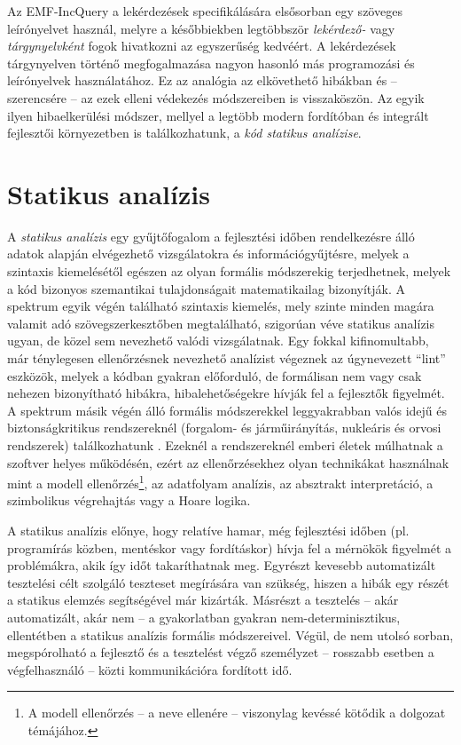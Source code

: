 Az EMF-IncQuery a lekérdezések specifikálására elsősorban egy szöveges leírónyelvet használ, melyre a későbbiekben legtöbbször \emph{lekérdező-} vagy \emph{tárgynyelvként} fogok hivatkozni az egyszerűség kedvéért.
A lekérdezések tárgynyelven történő megfogalmazása nagyon hasonló más programozási és leírónyelvek használatához.
Ez az analógia az elkövethető hibákban és -- szerencsére -- az ezek elleni védekezés módszereiben is visszaköszön.
Az egyik ilyen hibaelkerülési módszer, mellyel a legtöbb modern fordítóban és integrált fejlesztői környezetben is találkozhatunk, a \emph{kód statikus analízise}.

\section{Statikus analízis}

A \emph{statikus analízis} egy gyűjtőfogalom a fejlesztési időben rendelkezésre álló adatok alapján elvégezhető vizsgálatokra és információgyűjtésre, melyek a szintaxis kiemelésétől egészen az olyan formális módszerekig terjedhetnek, melyek a kód bizonyos szemantikai tulajdonságait matematikailag bizonyítják.
A spektrum egyik végén található szintaxis kiemelés, mely szinte minden magára valamit adó szövegszerkesztőben megtalálható, szigorúan véve statikus analízis ugyan, de közel sem nevezhető valódi vizsgálatnak.
Egy fokkal kifinomultabb, már ténylegesen ellenőrzésnek nevezhető analízist végeznek az úgynevezett ``lint'' eszközök, melyek a kódban gyakran előforduló, de formálisan nem vagy csak nehezen bizonyítható hibákra, hibalehetőségekre hívják fel a fejlesztők figyelmét.
A spektrum másik végén álló formális módszerekkel leggyakrabban valós idejű és biztonságkritikus rendszereknél (forgalom- és járműirányítás, nukleáris és orvosi rendszerek) találkozhatunk \cite{Storey:1996:SCC:524721}.
Ezeknél a rendszereknél emberi életek múlhatnak a szoftver helyes működésén, ezért az ellenőrzésekhez olyan technikákat használnak mint a modell ellenőrzés\footnote{A modell ellenőrzés -- a neve ellenére -- viszonylag kevéssé kötődik a dolgozat témájához.}, az adatfolyam analízis, az absztrakt interpretáció, a szimbolikus végrehajtás vagy a Hoare logika.

A statikus analízis előnye, hogy relatíve hamar, még fejlesztési időben (pl. programírás közben, mentéskor vagy fordításkor) hívja fel a mérnökök figyelmét a problémákra, akik így időt takaríthatnak meg.
Egyrészt kevesebb automatizált tesztelési célt szolgáló teszteset megírására van szükség, hiszen a hibák egy részét a statikus elemzés segítségével már kizárták.
Másrészt a tesztelés -- akár automatizált, akár nem -- a gyakorlatban gyakran nem-determinisztikus, ellentétben a statikus analízis formális módszereivel.
Végül, de nem utolsó sorban, megspórolható a fejlesztő és a tesztelést végző személyzet -- rosszabb esetben a végfelhasználó -- közti kommunikációra fordított idő.

